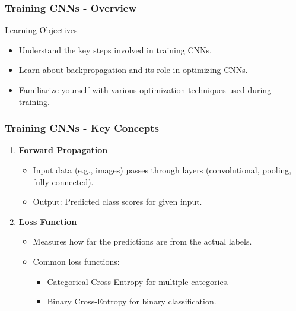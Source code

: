 \documentclass[aspectratio=169]{beamer}
\begin{document}
\begin{frame}[fragile]
    \frametitle{Training CNNs - Overview}
    \begin{block}{Learning Objectives}
        \begin{itemize}
            \item Understand the key steps involved in training CNNs.
            \item Learn about backpropagation and its role in optimizing CNNs.
            \item Familiarize yourself with various optimization techniques used during training.
        \end{itemize}
    \end{block}
\end{frame}

\begin{frame}[fragile]
    \frametitle{Training CNNs - Key Concepts}
    \begin{enumerate}
        \item \textbf{Forward Propagation}
        \begin{itemize}
            \item Input data (e.g., images) passes through layers (convolutional, pooling, fully connected).
            \item Output: Predicted class scores for given input.
        \end{itemize}

        \item \textbf{Loss Function}
        \begin{itemize}
            \item Measures how far the predictions are from the actual labels.
            \item Common loss functions:
            \begin{itemize}
                \item Categorical Cross-Entropy for multiple categories.
                \item Binary Cross-Entropy for binary classification.
            \end{itemize}
        \end{itemize}
    \end{enumerate}
\end{frame}
\end{document}
